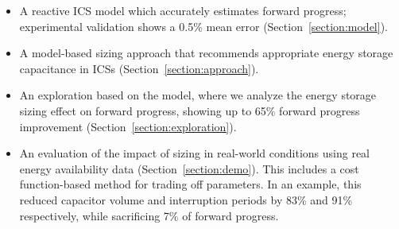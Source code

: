\begin{itemize}
    \item A reactive ICS model which accurately estimates forward progress; experimental validation shows a 0.5\% mean error (Section~\ref{section:model}). %
    \item A model-based sizing approach that recommends appropriate energy storage capacitance in ICSs (Section~\ref{section:approach}).
	\item An exploration based on the model, where we analyze the energy storage sizing effect on forward progress, showing up to 65\% forward progress improvement (Section~\ref{section:exploration}).     %
    \item An evaluation of the impact of sizing in real-world conditions using real energy availability data (Section~\ref{section:demo}). This includes a cost function-based method for trading off parameters. In an example, this reduced capacitor volume and interruption periods by 83\% and 91\% respectively, while sacrificing 7\% of forward progress.



\end{itemize}
